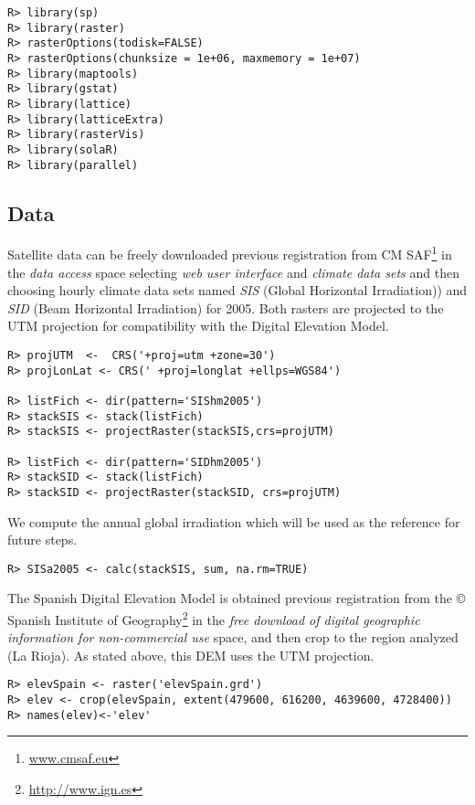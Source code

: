 \documentclass[authoryear, sort&compress]{elsarticle}
\begin{document}
\lstset{language=R,numbers=none}
\begin{lstlisting} 
R> library(sp)
R> library(raster)
R> rasterOptions(todisk=FALSE)
R> rasterOptions(chunksize = 1e+06, maxmemory = 1e+07)
R> library(maptools)
R> library(gstat)
R> library(lattice)
R> library(latticeExtra)
R> library(rasterVis)
R> library(solaR)
R> library(parallel)
\end{lstlisting}

\subsection{Data}
\label{sec-1-2}

Satellite data can be freely downloaded previous registration from CM
SAF\footnote{\url{www.cmsaf.eu}} in the \emph{data access} space selecting \emph{web user interface} and \emph{climate data sets} and then choosing
hourly climate data sets named \emph{SIS} (Global Horizontal
Irradiation)) and \emph{SID} (Beam Horizontal Irradiation) for
2005. Both rasters are projected to the UTM projection for
compatibility with the Digital Elevation Model.


\lstset{language=R,numbers=none}
\begin{lstlisting} 
R> projUTM  <-  CRS('+proj=utm +zone=30')
R> projLonLat <- CRS(' +proj=longlat +ellps=WGS84')

R> listFich <- dir(pattern='SIShm2005')
R> stackSIS <- stack(listFich)
R> stackSIS <- projectRaster(stackSIS,crs=projUTM)

R> listFich <- dir(pattern='SIDhm2005')
R> stackSID <- stack(listFich)
R> stackSID <- projectRaster(stackSID, crs=projUTM)
\end{lstlisting}

We compute the annual global irradiation which will be used as the
reference for future steps.
\lstset{language=R,numbers=none}
\begin{lstlisting} 
R> SISa2005 <- calc(stackSIS, sum, na.rm=TRUE)
\end{lstlisting}

The Spanish Digital Elevation Model is obtained previous registration from the \copyright
Spanish Institute of Geography\footnote{\url{http://www.ign.es}} in the \emph{free download of digital geographic information for non-commercial use} space, and then
crop to the region analyzed (La Rioja). As stated above, this DEM uses
the UTM projection.

\lstset{language=R,numbers=none}
\begin{lstlisting} 
R> elevSpain <- raster('elevSpain.grd')
R> elev <- crop(elevSpain, extent(479600, 616200, 4639600, 4728400))
R> names(elev)<-'elev'
\end{lstlisting}
\end{document}
